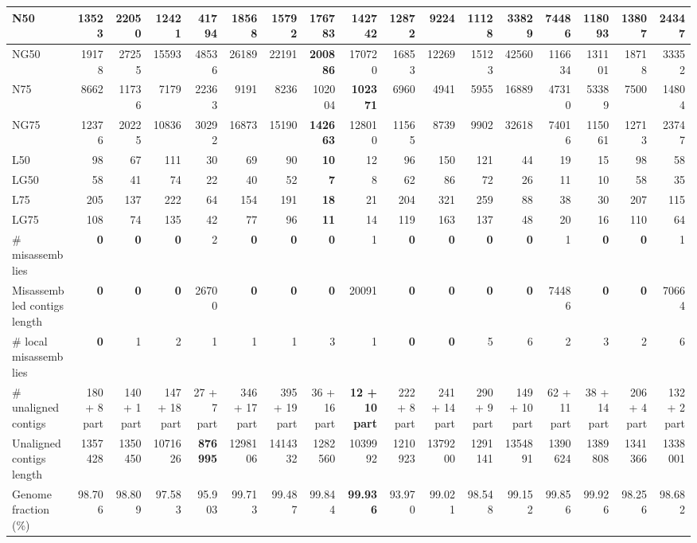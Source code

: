 \documentclass[12pt,a4paper]{article}
\begin{document}
\begin{table}[ht]
\begin{center}
\begin{tabular}{|l*{16}{|r}|}
N50 & 13523 & 22050 & 12421 & 41794 & 18568 & 15792 & {\bf 176783} & 142742 & 12872 & 9224 & 11128 & 33829 & 74486 & 118093 & 13807 & 24347 \\ \hline
NG50 & 19178 & 27255 & 15593 & 48536 & 26189 & 22191 & {\bf 200886} & 170720 & 16853 & 12269 & 15123 & 42560 & 116634 & 131101 & 18718 & 33352 \\ \hline
N75 & 8662 & 11736 & 7179 & 22363 & 9191 & 8236 & 102004 & {\bf 102371} & 6960 & 4941 & 5955 & 16889 & 47310 & 53389 & 7500 & 14804 \\ \hline
NG75 & 12376 & 20225 & 10836 & 30292 & 16873 & 15190 & {\bf 142663} & 128010 & 11565 & 8739 & 9902 & 32618 & 74016 & 115061 & 12713 & 23747 \\ \hline
L50 & 98 & 67 & 111 & 30 & 69 & 90 & {\bf 10} & 12 & 96 & 150 & 121 & 44 & 19 & 15 & 98 & 58 \\ \hline
LG50 & 58 & 41 & 74 & 22 & 40 & 52 & {\bf 7} & 8 & 62 & 86 & 72 & 26 & 11 & 10 & 58 & 35 \\ \hline
L75 & 205 & 137 & 222 & 64 & 154 & 191 & {\bf 18} & 21 & 204 & 321 & 259 & 88 & 38 & 30 & 207 & 115 \\ \hline
LG75 & 108 & 74 & 135 & 42 & 77 & 96 & {\bf 11} & 14 & 119 & 163 & 137 & 48 & 20 & 16 & 110 & 64 \\ \hline
\# misassemblies & {\bf 0} & {\bf 0} & {\bf 0} & 2 & {\bf 0} & {\bf 0} & {\bf 0} & 1 & {\bf 0} & {\bf 0} & {\bf 0} & {\bf 0} & 1 & {\bf 0} & {\bf 0} & 1 \\ \hline
Misassembled contigs length & {\bf 0} & {\bf 0} & {\bf 0} & 26700 & {\bf 0} & {\bf 0} & {\bf 0} & 20091 & {\bf 0} & {\bf 0} & {\bf 0} & {\bf 0} & 74486 & {\bf 0} & {\bf 0} & 70664 \\ \hline
\# local misassemblies & {\bf 0} & 1 & 2 & 1 & 1 & 1 & 3 & 1 & {\bf 0} & {\bf 0} & 5 & 6 & 2 & 3 & 2 & 6 \\ \hline
\# unaligned contigs & 180 + 8 part & 140 + 1 part & 147 + 18 part & 27 + 7 part & 346 + 17 part & 395 + 19 part & 36 + 16 part & {\bf 12 + 10 part} & 222 + 8 part & 241 + 14 part & 290 + 9 part & 149 + 10 part & 62 + 11 part & 38 + 14 part & 206 + 4 part & 132 + 2 part \\ \hline
Unaligned contigs length & 1357428 & 1350450 & 1071626 & {\bf 876995} & 1298106 & 1414332 & 1282560 & 1039992 & 1210923 & 1379200 & 1291141 & 1354891 & 1390624 & 1389808 & 1341366 & 1338001 \\ \hline
Genome fraction (\%) & 98.706 & 98.809 & 97.583 & 95.903 & 99.713 & 99.487 & 99.844 & {\bf 99.936} & 93.970 & 99.021 & 98.548 & 99.152 & 99.856 & 99.926 & 98.256 & 98.682 \\ \hline

\end{tabular}
\end{center}
\end{table}
\end{document}
